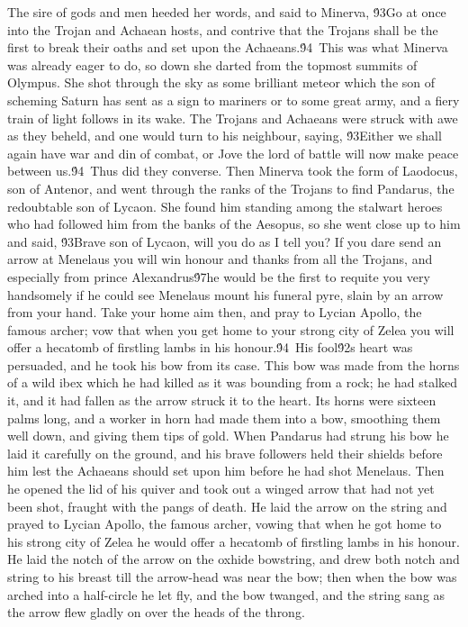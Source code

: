 {The sire of gods and men heeded her words, and said to Minerva, \'93Go at once into the Trojan and Achaean hosts, and contrive that the Trojans shall be the first to break their oaths and set upon the Achaeans.\'94\
This was what Minerva was already eager to do, so down she darted from the topmost summits of Olympus. She shot through the sky as some brilliant meteor which the son of scheming Saturn has sent as a sign to mariners or to some great army, and a fiery train of light follows in its wake. The Trojans and Achaeans were struck with awe as they beheld, and one would turn to his neighbour, saying, \'93Either we shall again have war and din of combat, or Jove the lord of battle will now make peace between us.\'94\
Thus did they converse. Then Minerva took the form of Laodocus, son of Antenor, and went through the ranks of the Trojans to find Pandarus, the redoubtable son of Lycaon. She found him standing among the stalwart heroes who had followed him from the banks of the Aesopus, so she went close up to him and said, \'93Brave son of Lycaon, will you do as I tell you? If you dare send an arrow at Menelaus you will win honour and thanks from all the Trojans, and especially from prince Alexandrus\'97he would be the first to requite you very handsomely if he could see Menelaus mount his funeral pyre, slain by an arrow from your hand. Take your home aim then, and pray to Lycian Apollo, the famous archer; vow that when you get home to your strong city of Zelea you will offer a hecatomb of firstling lambs in his honour.\'94\
His fool\'92s heart was persuaded, and he took his bow from its case. This bow was made from the horns of a wild ibex which he had killed as it was bounding from a rock; he had stalked it, and it had fallen as the arrow struck it to the heart. Its horns were sixteen palms long, and a worker in horn had made them into a bow, smoothing them well down, and giving them tips of gold. When Pandarus had strung his bow he laid it carefully on the ground, and his brave followers held their shields before him lest the Achaeans should set upon him before he had shot Menelaus. Then he opened the lid of his quiver and took out a winged arrow that had not yet been shot, fraught with the pangs of death. He laid the arrow on the string and prayed to Lycian Apollo, the famous archer, vowing that when he got home to his strong city of Zelea he would offer a hecatomb of firstling lambs in his honour. He laid the notch of the arrow on the oxhide bowstring, and drew both notch and string to his breast till the arrow-head was near the bow; then when the bow was arched into a half-circle he let fly, and the bow twanged, and the string sang as the arrow flew gladly on over the heads of the throng.\
}
